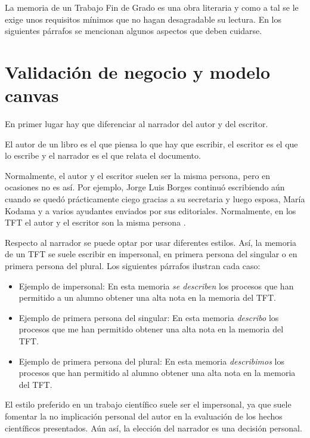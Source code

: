 \documentclass[12pt,spanish,chapterprefix, numbers=noenddot]{book}
\numberwithin{equation}{section}
\numberwithin{figure}{section}
\begin{document}
    La memoria de un Trabajo Fin de Grado es una obra literaria y como
    a tal se le exige unos requisitos mínimos que no hagan desagradable
    su lectura. En los siguientes párrafos se mencionan algunos aspectos
    que deben cuidarse.

    \section{Validación de negocio y modelo canvas}

    En primer lugar hay que diferenciar al narrador del autor y del escritor.

    El autor de un libro es el que piensa lo que hay que escribir, el
    escritor es el que lo escribe y el narrador es el que relata el documento.

    Normalmente, el autor y el escritor suelen ser la misma persona, pero
    en ocasiones no es así. Por ejemplo, Jorge Luis Borges continuó escribiendo
    aún cuando se quedó prácticamente ciego gracias a su secretaria y
    luego esposa, María Kodama y a varios ayudantes enviados por sus editoriales.
    Normalmente, en los TFT el autor y el escritor son la misma persona
    \cite{Leo2014}.

    Respecto al narrador se puede optar por usar diferentes estilos. Así,
    la memoria de un TFT se suele escribir en impersonal, en primera persona
    del singular o en primera persona del plural. Los siguientes párrafos
    ilustran cada caso:
    \begin{itemize}
        \item Ejemplo de impersonal: En esta memoria \emph{se describen} los procesos
        que han permitido\emph{ }a un alumno obtener una alta nota en la memoria
        del TFT.
        \item Ejemplo de primera persona del singular: En esta memoria \emph{describo}
        los procesos que me han permitido obtener una alta nota en la memoria
        del TFT.
        \item Ejemplo de primera persona del plural: En esta memoria \emph{describimos}
        los procesos que han permitido al alumno obtener una alta nota en
        la memoria del TFT.
    \end{itemize}
    El estilo preferido en un trabajo científico suele ser el impersonal,
    ya que suele fomentar la no implicación personal del autor en la evaluación
    de los hechos científicos presentados. Aún así, la elección del narrador
    es una decisión personal.
\end{document}
